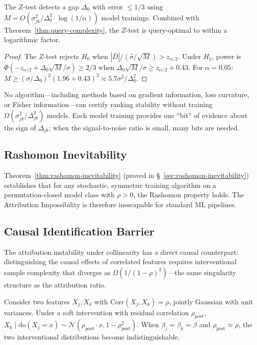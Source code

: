 \documentclass{jmlr}
\begin{document}
\begin{corollary}
\label{cor:z-test-optimal}
The $Z$-test detects a gap $\Delta_0$ with error $\leq 1/3$ using $M = O(\sigma_{jk}^2/\Delta_0^2 \cdot \log(1/\alpha))$ model trainings. Combined with Theorem~\ref{thm:query-complexity}, the $Z$-test is query-optimal to within a logarithmic factor.
\end{corollary}

\begin{proof}
The $Z$-test rejects $H_0$ when $|\bar{D}|/(\hat\sigma/\sqrt{M}) > z_{\alpha/2}$. Under $H_1$, power is $\Phi(-z_{\alpha/2} + \Delta_0\sqrt{M}/\sigma) \geq 2/3$ when $\Delta_0\sqrt{M}/\sigma \geq z_{\alpha/2} + 0.43$. For $\alpha = 0.05$: $M \geq (\sigma/\Delta_0)^2(1.96+0.43)^2 \approx 5.7\sigma^2/\Delta_0^2$.
\end{proof}

No algorithm---including methods based on gradient information, loss curvature, or Fisher information---can certify ranking stability without training $\Omega(\sigma_{jk}^2/\Delta_{jk}^2)$ models. Each model training provides one ``bit'' of evidence about the sign of $\Delta_{jk}$; when the signal-to-noise ratio is small, many bits are needed.

\subsection{Rashomon Inevitability}
\label{sec:inevitability}

Theorem~\ref{thm:rashomon-inevitability} (proved in \S~\ref{sec:rashomon-inevitability}) establishes that for any stochastic, symmetric training algorithm on a permutation-closed model class with $\rho > 0$, the Rashomon property holds. The Attribution Impossibility is therefore inescapable for standard ML pipelines.

\subsection{Causal Identification Barrier}
\label{sec:causal-barrier}

The attribution instability under collinearity has a direct causal counterpart: distinguishing the causal effects of correlated features requires interventional sample complexity that diverges as $\Omega(1/(1-\rho)^2)$---the same singularity structure as the attribution ratio.

Consider two features $X_j, X_k$ with $\text{Corr}(X_j, X_k) = \rho$, jointly Gaussian with unit variances. Under a soft intervention with residual correlation $\rho_{\text{post}}$, $X_k \mid \text{do}(X_j = x) \sim \mathcal{N}(\rho_{\text{post}} \cdot x, 1 - \rho_{\text{post}}^2)$. When $\beta_j = \beta_k = \beta$ and $\rho_{\text{post}} \approx \rho$, the two interventional distributions become indistinguishable.
\end{document}
